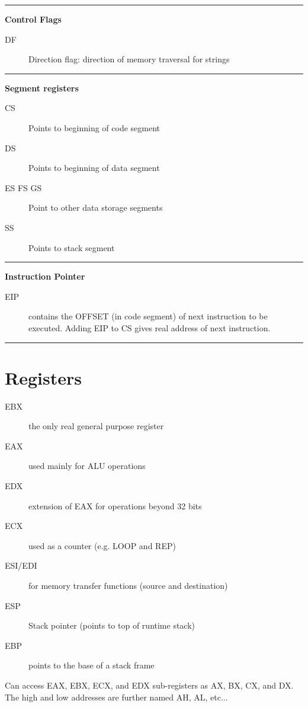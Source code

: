 \documentclass[10pt,landscape]{article}
\newcommand{\mysep}{\vspace{0.1cm}\hrule\vspace{0.1cm}}
\begin{document}
\begin{multicols*}{3}
\mysep

\textbf{Control Flags}

\begin{description}
  \item[DF] Direction flag: direction of memory traversal for strings
\end{description}

\mysep

\textbf{Segment registers}

\begin{description}
  \item[CS] Points to beginning of code segment
  \item[DS] Points to beginning of data segment
  \item[ES FS GS] Point to other data storage segments
  \item[SS] Points to stack segment
\end{description}

\mysep

\textbf{Instruction Pointer}

\begin{description}
  \item[EIP] contains the OFFSET (in code segment) of next instruction to be
    executed. Adding EIP to CS gives real address of next instruction. 
\end{description}

\mysep

\section{Registers}

\begin{description}
  \item[EBX] the only real general purpose register
  \item[EAX] used mainly for ALU operations
  \item[EDX] extension of EAX for operations beyond 32 bits
  \item[ECX] used as a counter (e.g. LOOP and REP)
  \item[ESI/EDI] for memory transfer functions (source and destination)
  \item[ESP] Stack pointer (points to top of runtime stack)
  \item[EBP] points to the base of a stack frame
\end{description}

Can access EAX, EBX, ECX, and EDX sub-registers as AX, BX, CX, and DX.
The high and low addresses are further named AH, AL, etc...


\end{multicols*}
\end{document}
